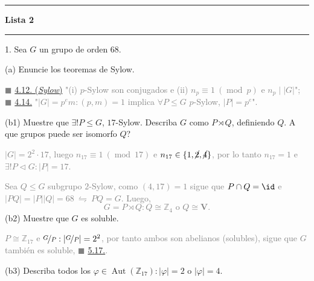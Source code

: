 \newcommand{\F}{\mathbb{F}}
\newcommand{\C}{\mathbb{C}}
\newcommand{\an}{\mathscr{A}} 
\newcommand{\Q}{\mathbb{Q}}
\renewcommand{\hom}{\operatorname{Hom}}
\newcommand{\ehom}{\operatorname{End}}

\-\vspace{-0.3cm}
  {\hrule \vspace{-0.15cm}
  \centering \textbf{Lista 2} \vspace{0.1cm}
  \hrule}

\vspace{0.2cm}
1. Sea \(G\) un grupo de orden \(68\). 

(a) Enuncie los teoremas de Sylow. 

\textcolor{gray}{\(\blacksquare\) \hyperlink{thm412}{4.12. (\emph{Sylow})} "(i) $p$-Sylow son conjugados e (ii) \(n_p \equiv 1 \ (\operatorname{mod} \ p)\) e \(n_p \mid |G|\)"; \(\blacksquare\) \hyperlink{thm414}{4.14.} "\(|G| = p^em : (p,m) = 1\) implica \(\forall P \leq G\) $p$-Sylow, \(|P| = p^e\)". } %

(b1) Muestre que \(\exists ! P \leq G\), \(17\)-Sylow. Describa \(G\) como \(P \rtimes Q\), definiendo \(Q\). A que grupos puede ser isomorfo \(Q\)?

\textcolor{gray}{
  \(|G|= 2^2 \cdot 17\), luego \(n_{17}\equiv 1 \ (\operatorname{mod} \ 17)\) e \(n_{17}\in\{1,\cancel{2},\cancel{4}\}\), por lo tanto \(n_{17} = 1\) e \(\exists ! P \lhd G : |P| = 17\). 
}

\textcolor{gray}{
  Sea \(Q\leq G\) subgrupo $2$-Sylow, como \((4,17)=1\) sigue que \(P \cap Q = \id\) e \(|PQ| = |P||Q| = 68 \ \leftrightharpoons \ PQ = G\). Luego, 
  \[G = P \rtimes Q : Q \cong \mathbb{Z}_4 \text{\ o \ } Q \cong \textbf{V}.\] 
}
\hspace{-0.1cm}(b2) Muestre que \(G\) es soluble.  

\newcommand{\Z}{\mathbb{Z}}
\textcolor{gray}{
  \(P \cong \Z_{17}\) e \(\nicefrac{G}{P} : |\nicefrac{G}{P}| = 2^2 \), por tanto ambos son abelianos (solubles), sigue que \(G\) también es soluble, \(\blacksquare\) \hyperlink{thm517}{5.17.}. 
}

(b3) Describa todos los \(\varphi \in \operatorname{Aut}(\Z_{17}) : |\varphi|= 2\) o \(|\varphi| = 4\).

